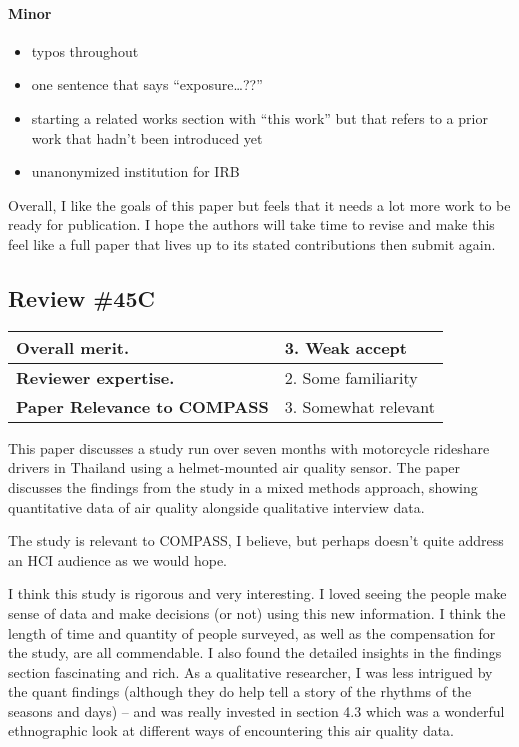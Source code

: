 \paragraph{Minor}
\begin{itemize}
\item
typos throughout
\item
one sentence that says “exposure…??”
\item
starting a related works section with “this work” but that refers to a prior work that hadn’t been introduced yet
\item
unanonymized institution for IRB
\end{itemize}

Overall, I like the goals of this paper but feels that it needs a lot more work to be ready for publication. I hope the authors will take time to revise and make this feel like a full paper that lives up to its stated contributions then submit again.


\clearpage
\subsection{Review \#45C}
\begin{table}[h]
\begin{tabular}{|l|l|}
    \hline
    \textbf{Overall merit.} &
3. Weak accept \\
    \hline
    \textbf{Reviewer expertise.} &
2. Some familiarity \\
    \hline
    \textbf{Paper Relevance to COMPASS} &
3. Somewhat relevant \\
    \hline
\end{tabular}
\end{table}

This paper discusses a study run over seven months with motorcycle rideshare drivers in Thailand using a helmet-mounted air quality sensor. The paper discusses the findings from the study in a mixed methods approach, showing quantitative data of air quality alongside qualitative interview data.

The study is relevant to COMPASS, I believe, but perhaps doesn't quite address an HCI audience as we would hope.

I think this study is rigorous and very interesting. I loved seeing the people make sense of data and make decisions (or not) using this new information. I think the length of time and quantity of people surveyed, as well as the compensation for the study, are all commendable. I also found the detailed insights in the findings section fascinating and rich. As a qualitative researcher, I was less intrigued by the quant findings (although they do help tell a story of the rhythms of the seasons and days) – and was really invested in section 4.3 which was a wonderful ethnographic look at different ways of encountering this air quality data.


